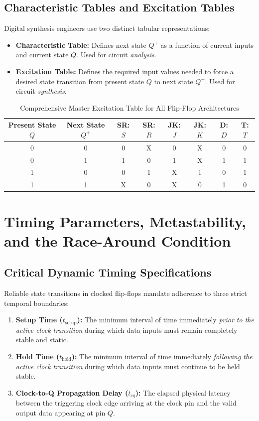 \subsection{Characteristic Tables and Excitation Tables}
Digital synthesis engineers use two distinct tabular representations:
\begin{itemize}
    \item \textbf{Characteristic Table:} Defines next state $Q^+$ as a function of current inputs and current state $Q$. Used for circuit \textit{analysis}.
    \item \textbf{Excitation Table:} Defines the required input values needed to force a desired state transition from present state $Q$ to next state $Q^+$. Used for circuit \textit{synthesis}.
\end{itemize}

\begin{table}[htbp]
\centering
\small
\caption{Comprehensive Master Excitation Table for All Flip-Flop Architectures}
\label{tab:master_excitation}
\begin{tabular}{c c c c c c c c}
\toprule
\textbf{Present State $Q$} & \textbf{Next State $Q^+$} & \textbf{SR: $S$} & \textbf{SR: $R$} & \textbf{JK: $J$} & \textbf{JK: $K$} & \textbf{D: $D$} & \textbf{T: $T$} \\
\midrule
0 & 0 & 0 & X & 0 & X & 0 & 0 \\
0 & 1 & 1 & 0 & 1 & X & 1 & 1 \\
1 & 0 & 0 & 1 & X & 1 & 0 & 1 \\
1 & 1 & X & 0 & X & 0 & 1 & 0 \\
\bottomrule
\end{tabular}
\end{table}


\section{Timing Parameters, Metastability, and the Race-Around Condition}
\label{sec:flipflop_timing}

\subsection{Critical Dynamic Timing Specifications}
Reliable state transitions in clocked flip-flops mandate adherence to three strict temporal boundaries:
\begin{enumerate}[label=\bfseries\arabic*.]
    \item \textbf{Setup Time ($t_{\text{setup}}$):} The minimum interval of time immediately \textit{prior to the active clock transition} during which data inputs must remain completely stable and static.
    \item \textbf{Hold Time ($t_{\text{hold}}$):} The minimum interval of time immediately \textit{following the active clock transition} during which data inputs must continue to be held stable.
    \item \textbf{Clock-to-Q Propagation Delay ($t_{cq}$):} The elapsed physical latency between the triggering clock edge arriving at the clock pin and the valid output data appearing at pin $Q$.
\end{enumerate}

